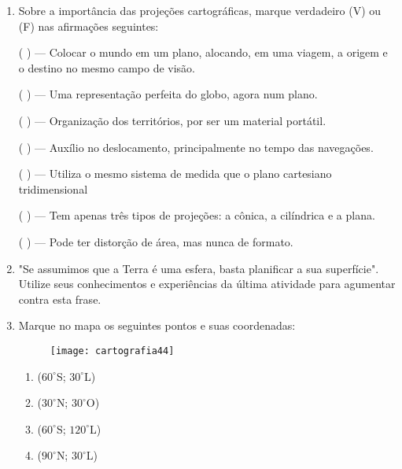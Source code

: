 {\begin{enumerate}
\begin{figure}[H]
\centering
\texttt{[image: cartografia38]}
\end{figure}

Sabendo que as figuras abaixo são projeções cartográficas da figura anterior, aponte as deformações ocorridas.

\begin{figure}[H]
\centering
\texttt{[image: cartografia390]}
\end{figure}


\item Sobre a importância das projeções cartográficas, marque verdadeiro (V) ou (F) nas afirmações seguintes:

({ }{ }{ }) --- Colocar o mundo em um plano, alocando, em uma viagem, a origem e o destino no mesmo campo de visão.

({ }{ }{ }) --- Uma representação perfeita do globo, agora num plano.

({ }{ }{ }) --- Organização dos territórios, por ser um material portátil.

({ }{ }{ }) --- Auxílio no deslocamento, principalmente no tempo das navegações.

({ }{ }{ }) --- Utiliza o mesmo sistema de medida que o plano cartesiano tridimensional

({ }{ }{ }) --- Tem apenas três tipos de projeções: a cônica, a cilíndrica e a plana.

({ }{ }{ }) --- Pode ter distorção de área, mas nunca de formato.

\item "Se assumimos que a Terra é uma esfera, basta planificar a sua superfície". Utilize seus conhecimentos e experiências da última atividade para agumentar contra esta frase.

\item Marque no mapa os seguintes pontos e suas coordenadas:

\begin{figure}[H]
\centering
\texttt{[image: cartografia44]}

\end{figure}

\begin{enumerate}
\item ($60^{\circ}$S; $30^{\circ}$L)
\item ($30^{\circ}$N; $30^{\circ}$O)
\item ($60^{\circ}$S; $120^{\circ}$L)
\item ($90^{\circ}$N; $30^{\circ}$L)
\end{enumerate}


\end{enumerate}}

